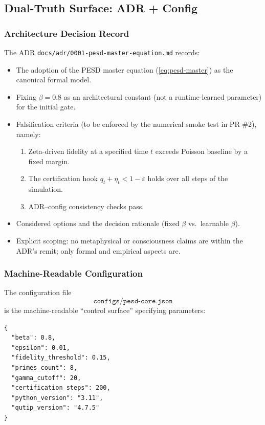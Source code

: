 \documentclass[11pt]{article}
\begin{document}
\subsection{Dual-Truth Surface: ADR + Config}

\subsubsection{Architecture Decision Record}

The ADR \texttt{docs/adr/0001-pesd-master-equation.md} records:

\begin{itemize}[nosep]
  \item The adoption of the PESD master equation (\ref{eq:pesd-master}) as the canonical formal model.
  \item Fixing \(\beta = 0.8\) as an architectural constant (not a runtime-learned parameter) for the initial gate.
  \item Falsification criteria (to be enforced by the numerical smoke test in PR \#2), namely:
  \begin{enumerate}[nosep]
    \item Zeta-driven fidelity at a specified time \(t\) exceeds Poisson baseline by a fixed margin.
    \item The certification hook \(q_t + \eta_t < 1 - \varepsilon\) holds over all steps of the simulation.
    \item ADR–config consistency checks pass.
  \end{enumerate}
  \item Considered options and the decision rationale (fixed \(\beta\) vs.\ learnable \(\beta\)).
  \item Explicit scoping: no metaphysical or consciousness claims are within the ADR's remit; only formal and empirical aspects are.
\end{itemize}

\subsubsection{Machine-Readable Configuration}

The configuration file
\[
\texttt{configs/pesd-core.json}
\]
is the machine-readable ``control surface'' specifying parameters:

\begin{verbatim}
{
  "beta": 0.8,
  "epsilon": 0.01,
  "fidelity_threshold": 0.15,
  "primes_count": 8,
  "gamma_cutoff": 20,
  "certification_steps": 200,
  "python_version": "3.11",
  "qutip_version": "4.7.5"
}
\end{verbatim}
\end{document}
